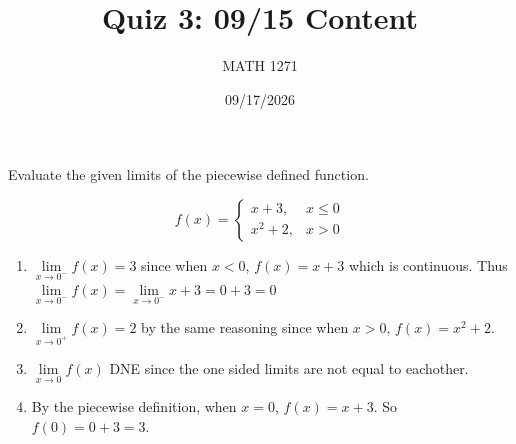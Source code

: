 \documentclass[addpoints,12pt]{exam}
\title{\vspace{-0.5in}Quiz 3: 09/15 Content}
\date{09/17/2026}
\author{MATH 1271}
\begin{document}
  \NameSection
  {\let\newpage\relax\maketitle}

  \PointsSection

  \newpage
  \begin{questions}
    \question Evaluate the given limits of the piecewise defined function.

    \begin{equation}
      f(x) = \begin{cases} x + 3, & x \leq 0 \\ x^2 + 2, & x > 0 \end{cases} 
    \end{equation}

    \begin{solution}
      \begin{enumerate}
        \item $\lim\limits_{x \rightarrow 0^{-}} f(x) = 3$ since when $x < 0$,
          $f(x) = x + 3$ which is continuous. Thus $\lim\limits_{x \rightarrow 0^{-}} f(x) = \lim\limits_{x \rightarrow 0^{-}} x + 3 = 0 + 3 = 0$
        \item $\lim\limits_{x \rightarrow 0^{+}} f(x) = 2$ by the same reasoning since when $x > 0$, $f(x) = x^2 + 2$.
        \item $\lim\limits_{x \rightarrow 0} f(x)$ DNE since the one sided limits are not equal to eachother.
        \item By the piecewise definition, when $x = 0$, $f(x) = x+3$. So $f(0) = 0 + 3 = 3$.
      \end{enumerate}
    \end{solution}
  \end{questions}
\end{document}
